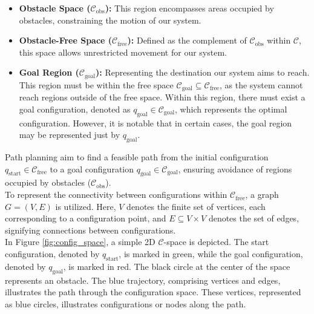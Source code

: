 \documentclass{ctuthesis}
\begin{document}
\begin{itemize}
    \item \textbf{Obstacle Space ($\mathcal{C}_{\text{obs}}$):} This region encompasses areas occupied by obstacles, constraining the motion of our system.
    \item \textbf{Obstacle-Free Space ($\mathcal{C}_{\text{free}}$):} Defined as the complement of $\mathcal{C}_{\text{obs}}$ within $\mathcal{C}$, this space allows unrestricted movement for our system.
    \item \textbf{Goal Region ($\mathcal{C}_{\text{goal}}$):} Representing the destination our system aims to reach. 
    This region must be within the free space $\mathcal{C}_{\text{goal}} \subseteq \mathcal{C}_{\text{free}}$, 
    as the system cannot reach regions outside of the free space. 
    Within this region, 
    there must exist a goal configuration, 
    denoted as $q_{\text{goal}}\in \mathcal{C}_{\text{goal}}$, 
    which represents the optimal configuration.
    However, it is notable that in certain cases, 
    the goal region may be represented just by $q_{\text{goal}}$.
\end{itemize} 
Path planning aim to find a feasible path from the initial configuration $q_{\text{start}} \in \mathcal{C}_{\text{free}}$ 
to a goal configuration $q_{\text{goal}} \in \mathcal{C}_{\text{goal}}$, 
ensuring avoidance of regions occupied by obstacles ($\mathcal{C}_{\text{obs}}$).\\[12pt]
To represent the connectivity between configurations within $\mathcal{C}_{\text{free}}$, a graph $G = (V, E)$ is utilized. 
Here, $V$ denotes the finite set of vertices, each corresponding to a configuration point, 
and $E \subseteq V \times V$ denotes the set of edges, signifying connections between configurations.\\[12pt]
In Figure \ref{fig:config_space}, a simple 2D $\mathcal{C}$-space is depicted. 
The start configuration, denoted by $q_{\text{start}}$, is marked in green, 
while the goal configuration, denoted by $q_{\text{goal}}$, is marked in red. 
The black circle at the center of the space represents an obstacle. 
The blue trajectory, comprising vertices and edges, 
illustrates the path through the configuration space. 
These vertices, represented as blue circles, illustrates configurations or nodes along the path.
\end{document}
